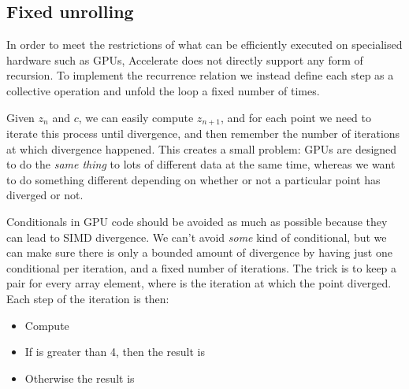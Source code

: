 \subsection{Fixed unrolling}

In order to meet the restrictions of what can be efficiently executed on
specialised hardware such as GPUs, Accelerate does not directly support any form
of recursion. To implement the recurrence relation we instead define each step
as a collective operation and unfold the loop a fixed number of times.

Given $z_{n}$ and $c$, we can easily compute $z_{n+1}$, and for each point we
need to iterate this process until divergence, and then remember the number of
iterations at which divergence happened. This creates a small problem: GPUs are
designed to do the \emph{same thing} to lots of different data at the same time,
whereas we want to do something different depending on whether or not a
particular point has diverged or not.

Conditionals in GPU code should be avoided as much as possible because they can
lead to SIMD divergence. We can't avoid \emph{some} kind of conditional, but we
can make sure there is only a bounded amount of divergence by having just one
conditional per iteration, and a fixed number of iterations. The trick is to
keep a pair  for every array element, where  is the
iteration at which the point  diverged. Each step of the iteration is
then:
%
\begin{itemize}
    \item Compute 
    \item If  is greater than 4, then the result is 
    \item Otherwise the result is 
\end{itemize}

